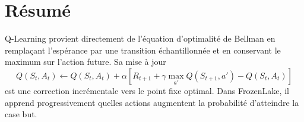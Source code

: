 \documentclass[11pt,a4paper]{article}
\begin{document}
\section{Résumé}

Q-Learning provient directement de l'équation d'optimalité de Bellman en remplaçant l'espérance par une transition échantillonnée et en conservant le maximum sur l'action future. Sa mise à jour
\[
Q(S_t,A_t)\leftarrow Q(S_t,A_t)+\alpha\left[R_{t+1}+\gamma \max_{a'}Q(S_{t+1},a')-Q(S_t,A_t)\right]
\]
est une correction incrémentale vers le point fixe optimal. Dans FrozenLake, il apprend progressivement quelles actions augmentent la probabilité d'atteindre la case but.
\end{document}
